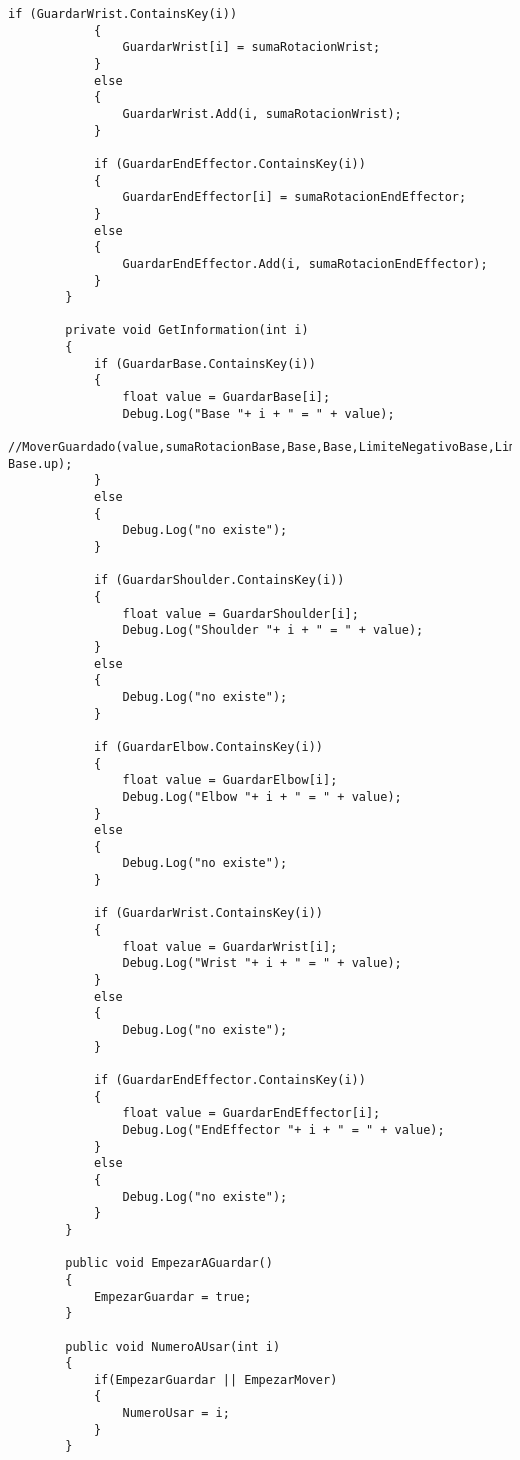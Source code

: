 \begin{lstlisting}[frame=single]
            if (GuardarWrist.ContainsKey(i))
            {
                GuardarWrist[i] = sumaRotacionWrist;
            }
            else
            {
                GuardarWrist.Add(i, sumaRotacionWrist);
            }
    
            if (GuardarEndEffector.ContainsKey(i))
            {
                GuardarEndEffector[i] = sumaRotacionEndEffector;
            }
            else
            {
                GuardarEndEffector.Add(i, sumaRotacionEndEffector);
            }
        }
    
        private void GetInformation(int i)
        {
            if (GuardarBase.ContainsKey(i))
            {
                float value = GuardarBase[i];
                Debug.Log("Base "+ i + " = " + value);
                //MoverGuardado(value,sumaRotacionBase,Base,Base,LimiteNegativoBase,LimitePositivoBase,velocidadRotacionBase,-Base.up);
            }
            else
            {
                Debug.Log("no existe");
            }
    
            if (GuardarShoulder.ContainsKey(i))
            {
                float value = GuardarShoulder[i];
                Debug.Log("Shoulder "+ i + " = " + value);
            }
            else
            {
                Debug.Log("no existe");
            }
    
            if (GuardarElbow.ContainsKey(i))
            {
                float value = GuardarElbow[i];
                Debug.Log("Elbow "+ i + " = " + value);
            }
            else
            {
                Debug.Log("no existe");
            }
    
            if (GuardarWrist.ContainsKey(i))
            {
                float value = GuardarWrist[i];
                Debug.Log("Wrist "+ i + " = " + value);
            }
            else
            {
                Debug.Log("no existe");
            }
    
            if (GuardarEndEffector.ContainsKey(i))
            {
                float value = GuardarEndEffector[i];
                Debug.Log("EndEffector "+ i + " = " + value);
            }
            else
            {
                Debug.Log("no existe");
            }
        }
    
        public void EmpezarAGuardar()
        {
            EmpezarGuardar = true;
        }
    
        public void NumeroAUsar(int i)
        {
            if(EmpezarGuardar || EmpezarMover)
            {
                NumeroUsar = i;
            }
        }
    

\end{lstlisting}
